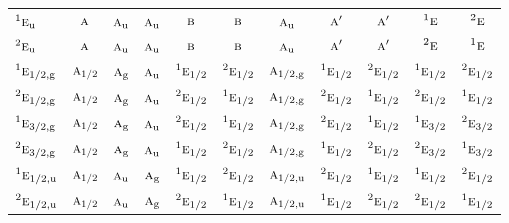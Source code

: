 \documentclass[10pt,a4paper]{article}
\numberwithin{equation}{section}
\newcommand{\irr}[1]{\text{\normalfont\scshape #1}}
\newcommand{\conjpair}[1]{{}^{#1}}
\newcommand{\ptag}[1]{\mathrm{#1}}
\begin{document}
{\begin{longtable}{@{}lcccccccccc@{}}
$\conjpair{1}\irr{e}_{\ptag{u}}$ & $\irr{a}$ & $\irr{a}_{\ptag{u}}$ & $\irr{a}_{\ptag{u}}$ & $\irr{b}$ & $\irr{b}$ & $\irr{a}_{\ptag{u}}$ & $\irr{a}'$ & $\irr{a}'$ & $\conjpair{1}\irr{e}$ & $\conjpair{2}\irr{e}$\\
$\conjpair{2}\irr{e}_{\ptag{u}}$ & $\irr{a}$ & $\irr{a}_{\ptag{u}}$ & $\irr{a}_{\ptag{u}}$ & $\irr{b}$ & $\irr{b}$ & $\irr{a}_{\ptag{u}}$ & $\irr{a}'$ & $\irr{a}'$ & $\conjpair{2}\irr{e}$ & $\conjpair{1}\irr{e}$\\
$\conjpair{1}\irr{e}_{1/2,\ptag{g}}$ & $\irr{a}_{1/2}$ & $\irr{a}_{\ptag{g}}$ & $\irr{a}_{\ptag{u}}$ & $\conjpair{1}\irr{e}_{1/2}$ & $\conjpair{2}\irr{e}_{1/2}$ & $\irr{a}_{1/2,\ptag{g}}$ & $\conjpair{1}\irr{e}_{1/2}$ & $\conjpair{2}\irr{e}_{1/2}$ & $\conjpair{1}\irr{e}_{1/2}$ & $\conjpair{2}\irr{e}_{1/2}$\\
$\conjpair{2}\irr{e}_{1/2,\ptag{g}}$ & $\irr{a}_{1/2}$ & $\irr{a}_{\ptag{g}}$ & $\irr{a}_{\ptag{u}}$ & $\conjpair{2}\irr{e}_{1/2}$ & $\conjpair{1}\irr{e}_{1/2}$ & $\irr{a}_{1/2,\ptag{g}}$ & $\conjpair{2}\irr{e}_{1/2}$ & $\conjpair{1}\irr{e}_{1/2}$ & $\conjpair{2}\irr{e}_{1/2}$ & $\conjpair{1}\irr{e}_{1/2}$\\
$\conjpair{1}\irr{e}_{3/2,\ptag{g}}$ & $\irr{a}_{1/2}$ & $\irr{a}_{\ptag{g}}$ & $\irr{a}_{\ptag{u}}$ & $\conjpair{2}\irr{e}_{1/2}$ & $\conjpair{1}\irr{e}_{1/2}$ & $\irr{a}_{1/2,\ptag{g}}$ & $\conjpair{2}\irr{e}_{1/2}$ & $\conjpair{1}\irr{e}_{1/2}$ & $\conjpair{1}\irr{e}_{3/2}$ & $\conjpair{2}\irr{e}_{3/2}$\\
$\conjpair{2}\irr{e}_{3/2,\ptag{g}}$ & $\irr{a}_{1/2}$ & $\irr{a}_{\ptag{g}}$ & $\irr{a}_{\ptag{u}}$ & $\conjpair{1}\irr{e}_{1/2}$ & $\conjpair{2}\irr{e}_{1/2}$ & $\irr{a}_{1/2,\ptag{g}}$ & $\conjpair{1}\irr{e}_{1/2}$ & $\conjpair{2}\irr{e}_{1/2}$ & $\conjpair{2}\irr{e}_{3/2}$ & $\conjpair{1}\irr{e}_{3/2}$\\
$\conjpair{1}\irr{e}_{1/2,\ptag{u}}$ & $\irr{a}_{1/2}$ & $\irr{a}_{\ptag{u}}$ & $\irr{a}_{\ptag{g}}$ & $\conjpair{1}\irr{e}_{1/2}$ & $\conjpair{2}\irr{e}_{1/2}$ & $\irr{a}_{1/2,\ptag{u}}$ & $\conjpair{2}\irr{e}_{1/2}$ & $\conjpair{1}\irr{e}_{1/2}$ & $\conjpair{1}\irr{e}_{1/2}$ & $\conjpair{2}\irr{e}_{1/2}$\\
$\conjpair{2}\irr{e}_{1/2,\ptag{u}}$ & $\irr{a}_{1/2}$ & $\irr{a}_{\ptag{u}}$ & $\irr{a}_{\ptag{g}}$ & $\conjpair{2}\irr{e}_{1/2}$ & $\conjpair{1}\irr{e}_{1/2}$ & $\irr{a}_{1/2,\ptag{u}}$ & $\conjpair{1}\irr{e}_{1/2}$ & $\conjpair{2}\irr{e}_{1/2}$ & $\conjpair{2}\irr{e}_{1/2}$ & $\conjpair{1}\irr{e}_{1/2}$\\

\end{longtable}}
\end{document}
